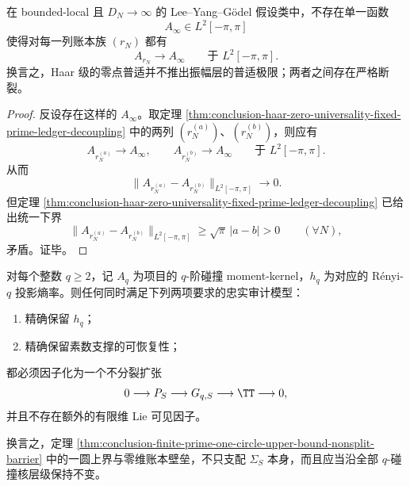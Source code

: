 \begin{theorem}\label{thm:conclusion-haar-zero-universality-does-not-force-amplitude-universality}
在 bounded-local 且 \(D_N\to\infty\) 的 Lee--Yang--Gödel 假设类中，不存在单一函数
\[
A_\infty\in L^2[-\pi,\pi]
\]
使得对每一列账本族 \((r_N)\) 都有
\[
A_{r_N}\longrightarrow A_\infty
\qquad\text{于 }L^2[-\pi,\pi].
\]
换言之，Haar 级的零点普适并不推出振幅层的普适极限；两者之间存在严格断裂。
\end{theorem}
\begin{proof}
反设存在这样的 \(A_\infty\)。取定理 \ref{thm:conclusion-haar-zero-universality-fixed-prime-ledger-decoupling} 中的两列 \((r_N^{(a)})\)、\((r_N^{(b)})\)，则应有
\[
A_{r_N^{(a)}}\to A_\infty,
\qquad
A_{r_N^{(b)}}\to A_\infty
\qquad\text{于 }L^2[-\pi,\pi].
\]
从而
\[
\|A_{r_N^{(a)}}-A_{r_N^{(b)}}\|_{L^2[-\pi,\pi]}\to 0.
\]
但定理 \ref{thm:conclusion-haar-zero-universality-fixed-prime-ledger-decoupling} 已给出统一下界
\[
\|A_{r_N^{(a)}}-A_{r_N^{(b)}}\|_{L^2[-\pi,\pi]}
\ge
\sqrt{\pi}\,|a-b|>0
\qquad(\forall N),
\]
矛盾。证毕。
\end{proof}

\begin{conjecture}\label{conj:conclusion-qcollision-one-circle-zero-dimensional-ledger-barrier}
对每个整数 \(q\ge 2\)，记 \(A_q\) 为项目的 \(q\)-阶碰撞 moment-kernel，\(h_q\) 为对应的 Rényi-\(q\) 投影熵率。则任何同时满足下列两项要求的忠实审计模型：
\begin{enumerate}
  \item 精确保留 \(h_q\)；
  \item 精确保留素数支撑的可恢复性；
\end{enumerate}
都必须因子化为一个不分裂扩张
\[
0\longrightarrow P_S\longrightarrow G_{q,S}\longrightarrow \TT\longrightarrow 0,
\]
并且不存在额外的有限维 Lie 可见因子。

换言之，定理 \ref{thm:conclusion-finite-prime-one-circle-upper-bound-nonsplit-barrier} 中的一圆上界与零维账本壁垒，不只支配 \(\Sigma_S\) 本身，而且应当沿全部 \(q\)-碰撞核层级保持不变。
\end{conjecture}





